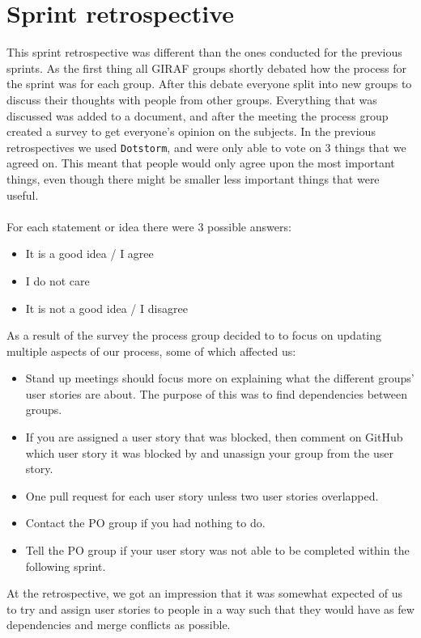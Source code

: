 \section{Sprint retrospective}\label{sprint-3-retrospective}
This sprint retrospective was different than the ones conducted for the previous sprints.
As the first thing all GIRAF groups shortly debated how the process for the sprint was for each group.
After this debate everyone split into new groups to discuss their thoughts with people from other groups.
Everything that was discussed was added to a document, and after the meeting the process group created a survey to get everyone's opinion on the subjects.
In the previous retrospectives we used \texttt{Dotstorm}, and were only able to vote on 3 things that we agreed on.
This meant that people would only agree upon the most important things, even though there might be smaller less important things that were useful.
\\\\
For each statement or idea there were 3 possible answers:
\begin{itemize}
    \item It is a good idea / I agree
    \item I do not care
    \item It is not a good idea / I disagree
\end{itemize}
As a result of the survey the process group decided to to focus on updating multiple aspects of our process, some of which affected us:
\begin{itemize}
    \item Stand up meetings should focus more on explaining what the different groups' user stories are about. The purpose of this was to find dependencies between groups.
    \item If you are assigned a user story that was blocked, then comment on GitHub which user story it was blocked by and unassign your group from the user story.
    \item One pull request for each user story unless two user stories overlapped.
    \item Contact the PO group if you had nothing to do.
    \item Tell the PO group if your user story was not able to be completed within the following sprint.
\end{itemize}
\noindent
At the retrospective, we got an impression that it was somewhat expected of us to try and assign user stories to people in a way such that they would have as few dependencies and merge conflicts as possible.
